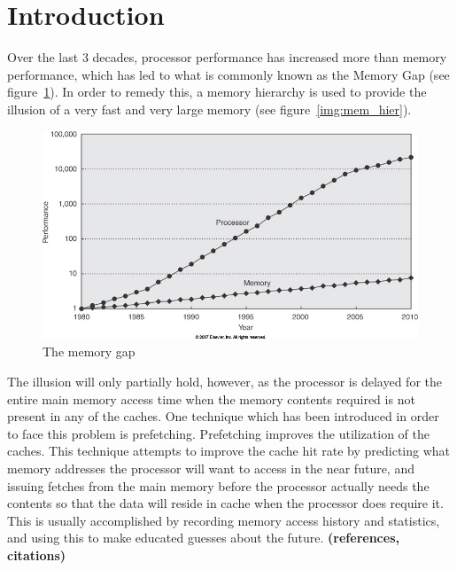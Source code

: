 
\section{Introduction}
\label{sec:introduction}
Over the last 3 decades, processor performance has increased more than memory performance,
which has led to what is commonly known as the Memory Gap (see figure~\ref{img:mem_gap}). In order to remedy this, a memory
hierarchy is used to provide the illusion of a very fast and very
large memory (see figure~\ref{img:mem_hier}). 

\begin{figure}[H]
	\centering
	\includegraphics[scale=0.3]{./img/mem_gap}
	\caption{The memory gap}
	\label{img:mem_gap}
\end{figure}

The illusion will only partially hold, however, as the processor is
delayed for the entire main memory access time when the memory contents required
is not present in any of the caches. One technique
which has been introduced in order to face this problem is prefetching. Prefetching improves the utilization of the caches. This technique
attempts to improve the cache hit rate by predicting what memory
addresses the processor will want to access in the near future, and
issuing fetches from the main memory before the processor actually
needs the contents so that the data will reside in cache when the
processor does require it. This is usually accomplished by recording
memory access history and statistics, and using this to make educated
guesses about the future. 
{\bf (references, citations)}

